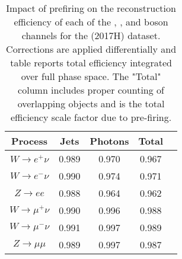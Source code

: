 \begin{table}[htbp]
\begin{center}
\begin{tabular}{|c|c|c|c|c|}
\hline
Process & Jets & Photons & Total \\\hline \hline
$W\rightarrow e^+\nu$      & 0.989 & 0.970 & 0.967 \\
$W\rightarrow e^-\nu$      & 0.990 & 0.974 & 0.971\\
$Z\rightarrow ee$          & 0.988 & 0.964 & 0.962 \\
\hline
$W\rightarrow \mu^+\nu$   & 0.990 & 0.996 & 0.988 \\
$W\rightarrow \mu^-\nu$   & 0.991 & 0.997 & 0.989 \\
$Z\rightarrow \mu\mu$     & 0.989 & 0.997 & 0.987 \\
\hline
\end{tabular}
\end{center}

\caption{Impact of prefiring on the reconstruction efficiency of each of the \Wp, \Wm, and \Z boson channels for the \sh (2017H) dataset. Corrections are applied differentially and table reports total efficiency integrated over full phase space. The "Total" column includes proper counting of overlapping objects and is the total efficiency scale factor due to pre-firing.}
\label{tab:prefire:13}
\end{table}
